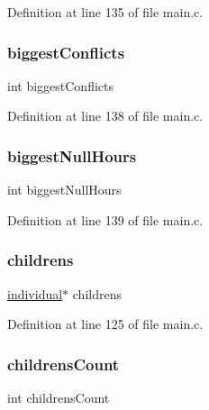 Definition at line 135 of file main.\+c.

\hypertarget{structparams_aeceaf128c1a93e23f79533ff51d9ebd9}{}\label{structparams_aeceaf128c1a93e23f79533ff51d9ebd9} 
\subsubsection{\texorpdfstring{biggest\+Conflicts}{biggestConflicts}}
{\footnotesize\ttfamily int biggest\+Conflicts}



Definition at line 138 of file main.\+c.

\hypertarget{structparams_a9b6eb91317b38a72b50eced2b8fbbafc}{}\label{structparams_a9b6eb91317b38a72b50eced2b8fbbafc} 
\subsubsection{\texorpdfstring{biggest\+Null\+Hours}{biggestNullHours}}
{\footnotesize\ttfamily int biggest\+Null\+Hours}



Definition at line 139 of file main.\+c.

\hypertarget{structparams_abf705e1aa269afb40b47480fe463009f}{}\label{structparams_abf705e1aa269afb40b47480fe463009f} 
\subsubsection{\texorpdfstring{childrens}{childrens}}
{\footnotesize\ttfamily \hyperlink{structindividual}{individual}$\ast$ childrens}



Definition at line 125 of file main.\+c.

\hypertarget{structparams_a4ba2f1442d3c206a25d4621420d892db}{}\label{structparams_a4ba2f1442d3c206a25d4621420d892db} 
\subsubsection{\texorpdfstring{childrens\+Count}{childrensCount}}
{\footnotesize\ttfamily int childrens\+Count}



